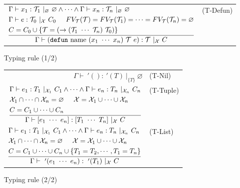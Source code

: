 \documentclass{article}
\begin{document}
\begin{figure}[tb]
\begin{tabular}{rlrl}
        \multicolumn{3}{r}{
        $\dfrac{
            \begin{aligned}
                &\Gamma \vdash x_1 : \mathcal{T}_1\ |_\varnothing\ \varnothing \land \cdots \land \Gamma \vdash x_n : \mathcal{T}_n\ |_\varnothing\ \varnothing \\
                &\Gamma \vdash e : \mathcal{T}_0\ |_{\mathcal{X}}\ C_0 \hspace{5mm} FV_\mathcal{T}(\mathcal{T}) = FV_\mathcal{T}(\mathcal{T}_1) = \cdots = FV_\mathcal{T}(\mathcal{T}_n) = \varnothing \\
                &C = C_0 \cup \{\mathcal{T} = (\rightarrow (\mathcal{T}_1\ \cdots\ \mathcal{T}_n)\ \mathcal{T}_0) \}
            \end{aligned}
        }{
            \Gamma \vdash (\mathtt{defun}\ \mathrm{name}\ (x_1\ \cdots\ x_n)\ \mathcal{T}\ e) : \mathcal{T}\ |_\mathcal{X}\ C
        }$
        } & (T-Defun)
    \end{tabular}
    \caption{Typing rule (1/2)}
\end{figure}

\begin{figure}[tb]
    \centering
    \begin{tabular}{rl}
        $\Gamma \vdash\ '() :\ '(T)\ |_{\{T\}}\ \varnothing$ & (T-Nil) \vspace{5mm} \\

        $\dfrac{
            \begin{aligned}
                &\Gamma \vdash e_1 : T_1\ |_{\mathcal{X}_1}\ C_1 \land \cdots \land \Gamma \vdash e_n : T_n\ |_{\mathcal{X}_n}\ C_n \\
                &\mathcal{X}_1 \cap \cdots \cap \mathcal{X}_n = \varnothing \hspace{5mm}
                \mathcal{X} = \mathcal{X}_1 \cup \cdots \cup \mathcal{X}_n \\
                &C = C_1 \cup \cdots \cup C_n
            \end{aligned}
        }{\Gamma \vdash [e_1\ \cdots\ e_n] : [T_1\ \cdots\ T_n]\ |_\mathcal{X}\ C}$ & (T-Tuple) \vspace{5mm} \\

        $\dfrac{
            \begin{aligned}
                &\Gamma \vdash e_1 : T_1\ |_{\mathcal{X}_1}\ C_1 \land \cdots \land \Gamma \vdash e_n : T_n\ |_{\mathcal{X}_n}\ C_n \\
                &\mathcal{X}_1 \cap \cdots \cap \mathcal{X}_n = \varnothing \hspace{5mm}
                \mathcal{X} = \mathcal{X}_1 \cup \cdots \cup \mathcal{X}_n \\
                &C = C_1 \cup \cdots \cup C_n \cup \{T_1 = T_2, \cdots, T_1 = T_n \}
            \end{aligned}
        }{\Gamma \vdash\ '(e_1\ \cdots\ e_n) :\ '(T_1)\ |_\mathcal{X}\ C}$ & (T-List) \\
    \end{tabular}
    \caption{Typing rule (2/2)}
\end{figure}
\end{document}
